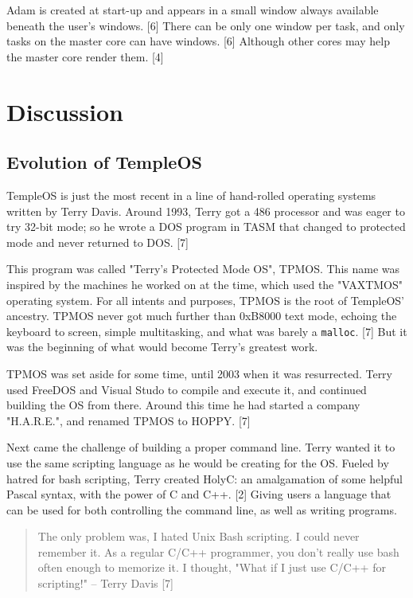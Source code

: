 \documentclass[11pt]{article}
\begin{document}
Adam is created at start-up and appears in a small window always available
beneath the user's windows. [6] There can be only one window per task, and only
tasks on the master core can have windows. [6] Although other cores may help the
master core render them. [4]

 \newpage

\section{Discussion}
\label{sec:org746c557}

\subsection{Evolution of TempleOS}
\label{sec:orgf1c06b0}

TempleOS is just the most recent in a line of hand-rolled operating systems
written by Terry Davis. Around 1993, Terry got a 486 processor and was eager to
try 32-bit mode; so he wrote a DOS program in TASM that changed to protected
mode and never returned to DOS. [7]

This program was called "Terry's Protected Mode OS", TPMOS. This name was
inspired by the machines he worked on at the time, which used the "VAXTMOS"
operating system. For all intents and purposes, TPMOS is the root of TempleOS'
ancestry. TPMOS never got much further than 0xB8000 text mode, echoing the
keyboard to screen, simple multitasking, and what was barely a \texttt{malloc}. [7] But
it was the beginning of what would become Terry's greatest work.

TPMOS was set aside for some time, until 2003 when it was resurrected. Terry
used FreeDOS and Visual Studo to compile and execute it, and continued building
the OS from there. Around this time he had started a company "H.A.R.E.", and
renamed TPMOS to HOPPY. [7]

Next came the challenge of building a proper command line. Terry wanted it to
use the same scripting language as he would be creating for the OS. Fueled by
hatred for bash scripting, Terry created HolyC: an amalgamation of some helpful
Pascal syntax, with the power of C and C++. [2] Giving users a language that can
be used for both controlling the command line, as well as writing programs.

\begin{quote}
The only problem was, I hated Unix Bash scripting. I could never remember it. As
a regular C/C++ programmer, you don't really use bash often enough to memorize
it. I thought, "What if I just use C/C++ for scripting!" -- Terry Davis [7]
\end{quote}
\end{document}
